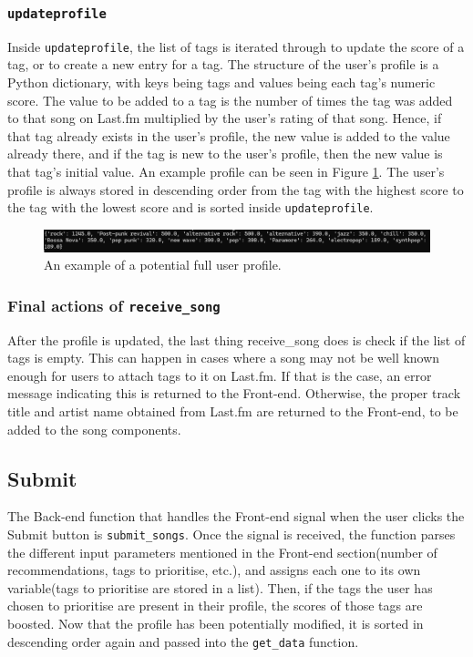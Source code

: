 \documentclass{l4proj}
\begin{document}
\subsubsection{\texttt{updateprofile}}
Inside \texttt{updateprofile}, the list of tags is iterated through to update the score of a tag, or to create a new entry for a tag. The structure of the user's profile is a Python dictionary, with keys being tags and values being each tag's numeric score. The value to be added to a tag is the number of times the tag was added to that song on Last.fm multiplied by the user's rating of that song. Hence, if that tag already exists in the user's profile, the new value is added to the value already there, and if the tag is new to the user's profile, then the new value is that tag's initial value. An example profile can be seen in Figure \ref{fig:prof}. The user's profile is always stored in descending order from the tag with the highest score to the tag with the lowest score and is sorted inside \texttt{updateprofile}. 
\begin{figure}
    \centering
    \includegraphics[width=1\linewidth]{images/profile.png}
    \caption{An example of a potential full user profile.}
    \label{fig:prof}
\end{figure}
\subsubsection{Final actions of \texttt{receive\_song}}
After the profile is updated, the last thing receive\_song does is check if the list of tags is empty. This can happen in cases where a song may not be well known enough for users to attach tags to it on Last.fm. If that is the case, an error message indicating this is returned to the Front-end. Otherwise, the proper track title and artist name obtained from Last.fm are returned to the Front-end, to be added to the song components.
\subsection{Submit}
The Back-end function that handles the Front-end signal when the user clicks the Submit button is \texttt{submit\_songs}. Once the signal is received, the function parses the different input parameters mentioned in the Front-end section(number of recommendations, tags to prioritise, etc.), and assigns each one to its own variable(tags to prioritise are stored in a list). Then, if the tags the user has chosen to prioritise are present in their profile, the scores of those tags are boosted. Now that the profile has been potentially modified, it is sorted in descending order again and passed into the \texttt{get\_data} function.
\end{document}
